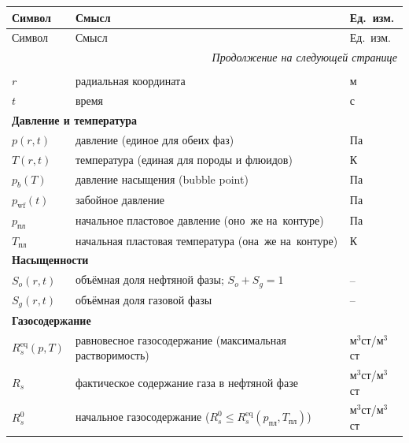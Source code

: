 \documentclass[12pt,a4paper]{article}
\newcommand{\ppl}{p_{\text{пл}}}
\newcommand{\pwf}{p_{\mathrm{wf}}}
\newcommand{\pb}{p_b}
\newcommand{\Tpl}{T_{\text{пл}}}
\begin{document}
\begin{longtable}{lll}
\toprule
Символ & Смысл & Ед.~изм. \\
\midrule
\endfirsthead
\toprule
Символ & Смысл & Ед.~изм. \\
\midrule
\endhead
\midrule
\multicolumn{3}{r}{\small\itshape Продолжение на следующей странице} \\
\bottomrule
\endfoot
\bottomrule
\endlastfoot

\multicolumn{3}{l}{\textbf{Координаты и время}} \\
$r$           & радиальная координата                    & м \\
$t$           & время                                     & с \\

\multicolumn{3}{l}{\textbf{Давление и температура}} \\
$p(r,t)$      & давление (единое для обеих фаз)          & Па \\
$T(r,t)$      & температура (единая для породы и флюидов) & К \\
$\pb(T)$      & давление насыщения (bubble point)         & Па \\
$\pwf(t)$     & забойное давление                         & Па \\
$\ppl$        & начальное пластовое давление (оно~же на~контуре) & Па \\
$\Tpl$        & начальная пластовая температура (она~же на~контуре) & К \\

\multicolumn{3}{l}{\textbf{Насыщенности}} \\
$S_o(r,t)$    & объёмная доля нефтяной фазы; $S_o+S_g=1$ & --\\
$S_g(r,t)$    & объёмная доля газовой фазы                & --\\

\multicolumn{3}{l}{\textbf{Газосодержание}} \\
$R_s^{\text{eq}}(p,T)$ & равновесное газосодержание (максимальная растворимость) & м$^3$ст/м$^3$ст \\
$R_s$         & фактическое содержание газа в нефтяной фазе & м$^3$ст/м$^3$ст \\
$R_s^0$       & начальное газосодержание ($R_s^0 \leqslant R_s^{\text{eq}}(\ppl, \Tpl)$) & м$^3$ст/м$^3$ст \\


\end{longtable}
\end{document}

